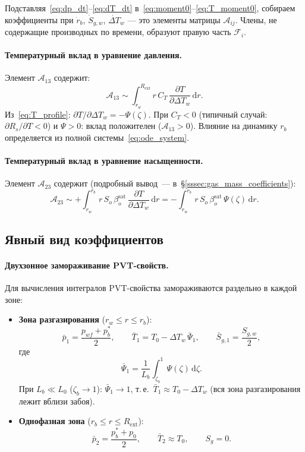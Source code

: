 \documentclass[12pt,a4paper]{article}
\newcommand{\dd}{\mathrm{d}}
\newcommand{\pp}{\partial}
\newcommand{\ext}{\mathrm{ext}}
\newcommand{\sat}{\mathrm{sat}}
\begin{document}
Подставляя~\eqref{eq:dp_dt}--\eqref{eq:dT_dt}
в~\eqref{eq:moment0}--\eqref{eq:T_moment0}, собираем
коэффициенты при $\dot{r}_b$, $\dot{S}_{g,w}$,
$\dot{\Delta T}_w$ --- это элементы матрицы
$\mathcal{A}_{ij}$. Члены, не содержащие производных
по времени, образуют правую часть $\mathcal{F}_i$.

\paragraph{Температурный вклад в уравнение давления.}
Элемент $\mathcal{A}_{13}$ содержит:
\[
  \mathcal{A}_{13} \sim \int_{r_w}^{R_\ext} r\,C_T\,
    \frac{\pp T}{\pp \Delta T_w}\,\dd r.
\]
Из~\eqref{eq:T_profile}: $\pp T/\pp \Delta T_w = -\Psi(\zeta)$.
При $C_T < 0$ (типичный случай: $\pp R_s/\pp T < 0$)
и $\Psi > 0$: вклад положителен ($\mathcal{A}_{13} > 0$).
Влияние на динамику $r_b$ определяется из полной
системы~\eqref{eq:ode_system}.

\paragraph{Температурный вклад в уравнение насыщенности.}
Элемент $\mathcal{A}_{23}$ содержит (подробный
вывод~--- в~\S\ref{sssec:gas_mass_coefficients}):
\[
  \mathcal{A}_{23} \sim +\int_{r_w}^{r_b} r\,S_o\,\beta_o^\sat\,
    \frac{\pp T}{\pp \Delta T_w}\,\dd r
  = -\int_{r_w}^{r_b} r\,S_o\,\beta_o^\sat\,\Psi(\zeta)\,\dd r.
\]


\subsection{Явный вид коэффициентов}
\label{ssec:explicit_coefficients}

\paragraph{Двухзонное замораживание PVT-свойств.}
\label{par:frozen_pvt}
Для вычисления интегралов PVT-свойства замораживаются
раздельно в каждой зоне:
\begin{itemize}[nosep]
  \item \textbf{Зона разгазирования} ($r_w \leqslant r \leqslant r_b$):
        \[
          \bar{p}_1 = \frac{p_{wf} + p_b^*}{2}, \qquad
          \bar{T}_1 = T_0 - \Delta T_w\,\bar{\Psi}_1,
          \qquad
          \bar{S}_{g,1} = \frac{S_{g,w}}{2},
        \]
        где
        \[
          \bar{\Psi}_1
          = \frac{1}{L_b}\int_{\zeta_b}^{1}\Psi(\zeta)\,\dd\zeta.
        \]
        При $L_b \ll L_0$ ($\zeta_b \to 1$):
        $\bar{\Psi}_1 \to 1$, т.\,е.\ $\bar{T}_1 \approx T_0 - \Delta T_w$
        (вся зона разгазирования лежит вблизи забоя).
  \item \textbf{Однофазная зона} ($r_b \leqslant r \leqslant R_\ext$):
        \[
          \bar{p}_2 = \frac{p_b^* + p_0}{2}, \qquad
          \bar{T}_2 \approx T_0, \qquad
          S_g = 0.
        \]
\end{itemize}
\end{document}
